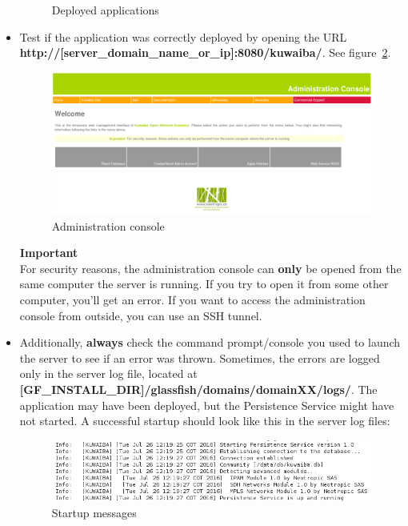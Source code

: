 \documentclass[a4paper]{article}
\begin{document}
\begin{itemize}
\begin{figure}[h!]
					\caption{Deployed applications}
					\label{fig:dapplications}		  
				\end{figure}				
				\item Test if the application was correctly deployed by opening the URL \\ \textbf{http://[server\_domain\_name\_or\_ip]:8080/kuwaiba/}. See figure~\ref{fig:kw_managementconsole}.
				\begin{figure}[h!]
					\includegraphics[width=\linewidth]{img/kw_management_console.png} 	
					\caption{Administration console}
					\label{fig:kw_managementconsole}
				\end{figure}
				
				\begin{framed} {\large \textbf{Important}} \\
					For security reasons, the administration console can \textbf{only} be opened from the same computer the server is running. If you try to open it from some other computer, you'll get an error. If you want to access the administration console from outside, you can use an SSH tunnel.
				\end{framed}
				\item Additionally, \textbf{always} check the command prompt/console you used to launch the server to see if an error was thrown. Sometimes, the errors are logged only in the server log file, located at \textbf{[GF\_INSTALL\_DIR]/glassfish/domains/domainXX/logs/}. The application may have been deployed, but the Persistence Service might have not started. A successful startup should look like this in the server log files:
				\begin{figure}[h!]
					\includegraphics[width=\linewidth]{img/log_messages.png} 	
					\caption{Startup messages}
					\label{fig:startup_messages}
				\end{figure}
			\end{itemize}
			
\end{document}
